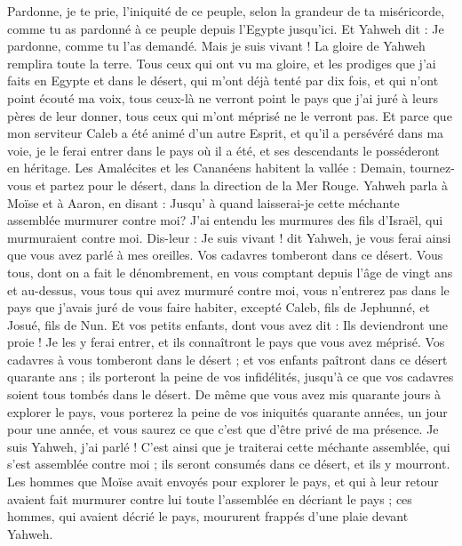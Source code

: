 \begin{multicols}{2}
Pardonne, je te prie, l'iniquité de ce peuple, selon la grandeur de ta miséricorde, comme tu as pardonné à ce peuple depuis l'Egypte jusqu'ici.
Et Yahweh dit : Je pardonne, comme tu l’as demandé.
Mais je suis vivant ! La gloire de Yahweh remplira toute la terre.
Tous ceux qui ont vu ma gloire, et les prodiges que j'ai faits en Egypte et dans le désert, qui m'ont déjà tenté par dix fois, et qui n’ont point écouté ma voix,
tous ceux-là ne verront point le pays que j'ai juré à leurs pères de leur donner, tous ceux qui m'ont méprisé ne le verront pas.
Et parce que mon serviteur Caleb a été animé d'un autre Esprit, et qu'il a persévéré dans ma voie, je le ferai entrer dans le pays où il a été, et ses descendants le posséderont en héritage.
Les Amalécites et les Cananéens habitent la vallée : Demain, tournez-vous et partez pour le désert, dans la direction de la Mer Rouge.
Yahweh parla à Moïse et à Aaron, en disant :
Jusqu’ à quand laisserai-je cette méchante assemblée murmurer contre moi? J'ai entendu les murmures des fils d'Israël, qui murmuraient contre moi.
Dis-leur : Je suis vivant ! dit Yahweh, je vous ferai ainsi que vous avez parlé à mes oreilles.
Vos cadavres tomberont dans ce désert. Vous tous, dont on a fait le dénombrement, en vous comptant depuis l’âge de vingt ans et au-dessus, vous tous qui avez murmuré contre moi,
vous n’entrerez pas dans le pays que j’avais juré de vous faire habiter, excepté Caleb, fils de Jephunné, et Josué, fils de Nun.
Et vos petits enfants, dont vous avez dit : Ils deviendront une proie ! Je les y ferai entrer, et ils connaîtront le pays que vous avez méprisé.
Vos cadavres à vous tomberont dans le désert ;
et vos enfants paîtront dans ce désert quarante ans ; ils porteront la peine de vos infidélités, jusqu'à ce que vos cadavres soient tous tombés dans le désert.
De même que vous avez mis quarante jours à explorer le pays, vous porterez la peine de vos iniquités quarante années, un jour pour une année, et vous saurez ce que c’est que d’être privé de ma présence.
Je suis Yahweh, j’ai parlé ! C’est ainsi que je traiterai cette méchante assemblée, qui s’est assemblée contre moi ; ils seront consumés dans ce désert, et ils y mourront.
Les hommes que Moïse avait envoyés pour explorer le pays, et qui à leur retour avaient fait murmurer contre lui toute l'assemblée en décriant le pays ;
ces hommes, qui avaient décrié le pays, moururent frappés d’une plaie devant Yahweh.

\end{multicols}
